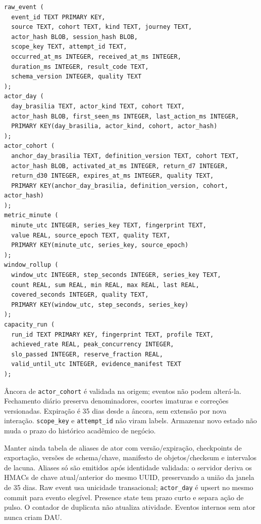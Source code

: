 \documentclass[10pt,a4paper]{article}
\begin{document}
\begin{verbatim}
raw_event (
  event_id TEXT PRIMARY KEY,
  source TEXT, cohort TEXT, kind TEXT, journey TEXT,
  actor_hash BLOB, session_hash BLOB,
  scope_key TEXT, attempt_id TEXT,
  occurred_at_ms INTEGER, received_at_ms INTEGER,
  duration_ms INTEGER, result_code TEXT,
  schema_version INTEGER, quality TEXT
);
actor_day (
  day_brasilia TEXT, actor_kind TEXT, cohort TEXT,
  actor_hash BLOB, first_seen_ms INTEGER, last_action_ms INTEGER,
  PRIMARY KEY(day_brasilia, actor_kind, cohort, actor_hash)
);
actor_cohort (
  anchor_day_brasilia TEXT, definition_version TEXT, cohort TEXT,
  actor_hash BLOB, activated_at_ms INTEGER, return_d7 INTEGER,
  return_d30 INTEGER, expires_at_ms INTEGER, quality TEXT,
  PRIMARY KEY(anchor_day_brasilia, definition_version, cohort, actor_hash)
);
metric_minute (
  minute_utc INTEGER, series_key TEXT, fingerprint TEXT,
  value REAL, source_epoch TEXT, quality TEXT,
  PRIMARY KEY(minute_utc, series_key, source_epoch)
);
window_rollup (
  window_utc INTEGER, step_seconds INTEGER, series_key TEXT,
  count REAL, sum REAL, min REAL, max REAL, last REAL,
  covered_seconds INTEGER, quality TEXT,
  PRIMARY KEY(window_utc, step_seconds, series_key)
);
capacity_run (
  run_id TEXT PRIMARY KEY, fingerprint TEXT, profile TEXT,
  achieved_rate REAL, peak_concurrency INTEGER,
  slo_passed INTEGER, reserve_fraction REAL,
  valid_until_utc INTEGER, evidence_manifest TEXT
);
\end{verbatim}

Âncora de {\footnotesize\ttfamily\nolinkurl{actor_cohort}} é validada na origem; eventos não podem
alterá-la. Fechamento diário preserva denominadores, coortes imaturas e
correções versionadas. Expiração é 35 dias desde a âncora, sem extensão
por nova interação. {\footnotesize\ttfamily\nolinkurl{scope_key}} e {\footnotesize\ttfamily\nolinkurl{attempt_id}} não viram
labels. Armazenar novo estado não muda o prazo do histórico acadêmico de
negócio.

Manter ainda tabela de aliases de ator com versão/expiração, checkpoints
de exportação, versões de schema/chave, manifesto de objetos/checksum e
intervalos de lacuna. Aliases só são emitidos após identidade validada:
o servidor deriva os HMACs de chave atual/anterior do mesmo UUID,
preservando a união da janela de 35 dias. Raw event usa unicidade
transacional; {\footnotesize\ttfamily\nolinkurl{actor_day}} é upsert no mesmo commit para evento
elegível. Presence state tem prazo curto e separa ação de pulso. O
contador de duplicata não atualiza atividade. Eventos internos sem ator
nunca criam DAU.
\end{document}
